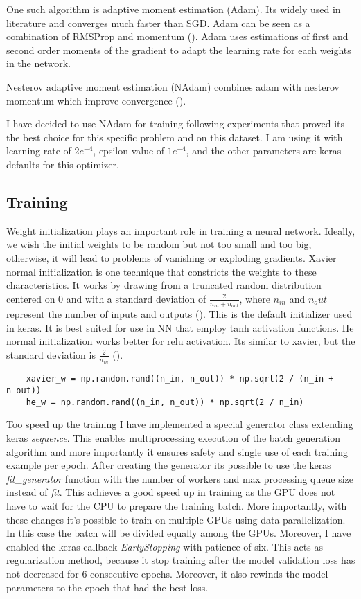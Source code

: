 One such algorithm is adaptive moment estimation (Adam). Its widely used in literature and converges much faster than SGD. Adam can be seen as a combination of RMSProp and momentum (\citet{Adam}). Adam uses estimations of first and second order moments of the gradient to adapt the learning rate for each weights in the network.

Nesterov adaptive moment estimation (NAdam) combines adam with nesterov momentum which improve convergence (\citet{NADAM}).

I have decided to use NAdam for training following experiments that proved its the best choice for this specific problem and on this dataset. I am using it with learning rate of $2e^{-4}$, epsilon value of $1e^{-4}$, and the other parameters are keras defaults for this optimizer.

\subsection{Training}
Weight initialization plays an important role in training a neural network. Ideally, we wish the initial weights to be random but not too small and too big, otherwise, it will lead to problems of vanishing or exploding gradients. Xavier normal initialization is one technique that constricts the weights to these characteristics. It works by drawing from a truncated random distribution centered on 0 and with a standard deviation of \(\frac{2}{n_{in} + n_{out}}\), where \(n_{in}\) and \(n_out\) represent the number of inputs and outputs (\citet{initialization}). This is the default initializer used in keras. It is best suited for use in NN that employ tanh activation functions. He normal initialization works better for relu activation. Its similar to xavier, but the standard deviation is \(\frac{2}{n_{in}}\) (\citet{rectifiers}).

\begin{verbatim}
    xavier_w = np.random.rand((n_in, n_out)) * np.sqrt(2 / (n_in + n_out))
    he_w = np.random.rand((n_in, n_out)) * np.sqrt(2 / n_in)
\end{verbatim}

Too speed up the training I have implemented a special generator class extending keras \emph{sequence}. This enables multiprocessing execution of the batch generation algorithm and more importantly it ensures safety and single use of each training example per epoch.
After creating the generator its possible to use the keras \emph{fit\_generator} function with the number of workers and max processing queue size instead of \emph{fit}. This achieves a good speed up in training as the GPU does not have to wait for the CPU to prepare the training batch. More importantly, with these changes it's possible to train on multiple GPUs using data parallelization. In this case the batch will be divided equally among the GPUs. 
Moreover, I have enabled the keras callback \emph{EarlyStopping} with patience of six. This acts as regularization method, because it stop training after the model validation loss has not decreased for 6 consecutive epochs. Moreover, it also rewinds the model parameters to the epoch that had the best loss.

